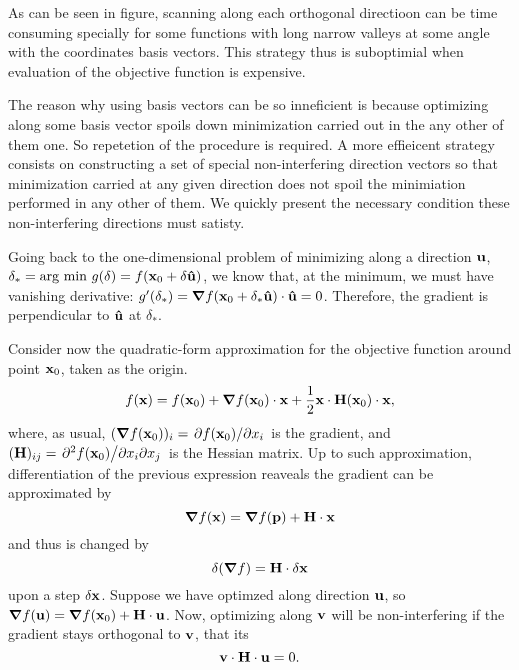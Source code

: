 As can be seen in figure, scanning along each orthogonal directioon can be time consuming specially for some functions with long narrow valleys at some angle with the coordinates basis vectors. This strategy thus is suboptimial when evaluation of the objective function is expensive.

The reason why using basis vectors can be so inneficient is because optimizing along some basis vector spoils down minimization carried out in the any other of them one. So repetetion of the procedure is required. A more effieicent strategy consists on constructing a set of special non-interfering direction vectors so that minimization carried at any given direction does not spoil the minimiation performed in any other of them. We quickly present the necessary condition these non-interfering directions must satisty.

Going back to the one-dimensional problem of minimizing along a direction $\vb{u}$, $\delta_* = \text{arg min}\ g(\delta) = f(\vb{x}_{0}+\delta\vu{u})$, we know that, at the minimum, we must have vanishing derivative: $g^{\prime}(\delta_*)=\grad f(\vb{x}_{0}+ \delta_* \vu{u})\cdot \vu{u}=0$. Therefore, the gradient is perpendicular to $\vu{u}$ at $\delta_*$.

Consider now the quadratic-form approximation for the objective function around point $\vb{x}_0$, taken as the origin.
\begin{equation}
    f(\vb{x})=f(\vb{x}_0)+\grad f(\vb{x}_0)\cdot \vb{x} + \frac{1}{2}\vb{x}\cdot\vb{H}(\vb{x}_0)\cdot\vb{x},
\end{equation}
where, as usual, $(\grad f(\vb{x}_0))_i = \pdv*{f(\vb{x}_0)}{x_i}$ is the gradient, and $(\vb{H})_{ij} = \pdv*{f(\vb{x}_0)}{x_i}{x_j}$ is the Hessian matrix. Up to such approximation, differentiation of the previous expression reaveals the gradient can be approximated by
\begin{equation}
    \grad f(\vb{x}) = \grad f(\vb{p}) + \vb{H}\cdot \vb{x}
\end{equation}
and thus is changed by
$$\delta(\grad f ) = \vb{H}\cdot \delta \vb{x}$$
upon a step $\vb{\delta \vb{x}}$. Suppose we have optimzed along direction $\vb{u}$, so $\grad f(\vb{u}) = \grad f(\vb{x}_0) + \vb{H}\cdot \vb{u}$. Now, optimizing along $\vb{v}$ will be non-interfering if the gradient stays orthogonal to $\vb{v}$, that its
\begin{equation}
    \vb{v}\cdot\vb{H}\cdot\vb{u}=0.
\end{equation}

